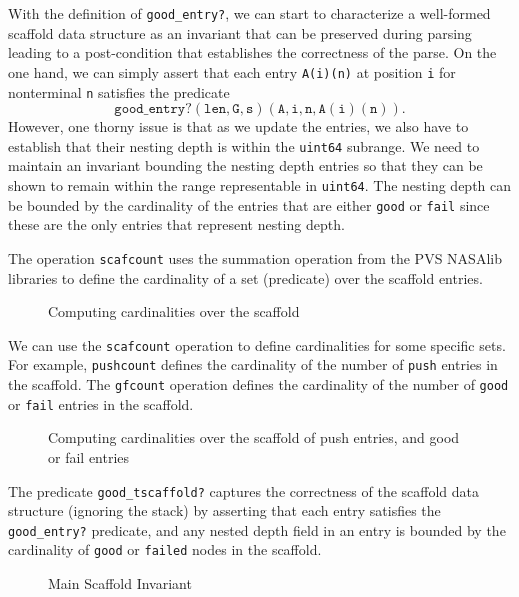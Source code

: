 \documentclass[sigplan,10pt,anonymous,review]{acmart}\settopmatter{printfolios=true,printccs=false,printacmref=false}
\begin{document}
\begin{CCSXML}
With the definition of \texttt{good\_entry?}, we can start to characterize
a well-formed scaffold data structure as an invariant that can be preserved
during parsing leading to a post-condition that establishes the correctness
of the parse.  On the one hand, we can simply assert that each entry \texttt{A(i)(n)} at position \texttt{i} for nonterminal \texttt{n}
satisfies the predicate
$$\mathtt{good\_entry?(len, G, s)(A, i, n, A(i)(n))}.$$  However, one
thorny issue is that as we update the entries, we also have to establish that their
nesting depth is within the \texttt{uint64} subrange.  We need to maintain
an invariant bounding the nesting depth entries so that they can be shown to
remain within the range representable in \texttt{uint64}\@.  The nesting
depth can be bounded by the cardinality of the entries that are
either \texttt{good} or \texttt{fail} since these are the only entries that
represent nesting depth.

The operation \texttt{scafcount} uses the summation operation from
the PVS NASAlib libraries to define the cardinality of a set (predicate)
over the scaffold entries.  

\begin{figure}[h!]
  
    \vspace*{-4mm}
\caption{Computing cardinalities over the scaffold}
\label{pvs:scafcount}
\end{figure}

We can use the \texttt{scafcount} operation to define cardinalities
for some specific sets.  For example, \texttt{pushcount} defines the
cardinality of the number of \texttt{push} entries in the scaffold.
The \texttt{gfcount} operation defines the cardinality of the number
of \texttt{good} or \texttt{fail} entries in the scaffold.

\begin{figure}[h!]
  
    \vspace*{-4mm}
\caption{Computing cardinalities over the scaffold of push entries, and good or fail entries}
\label{pvs:gfcount}
\end{figure}

The predicate \texttt{good\_tscaffold?} captures the correctness of the scaffold
data structure (ignoring the stack) by asserting that each  entry
satisfies the \texttt{good\_entry?} predicate, and any nested depth field
in an entry is bounded by the cardinality of \texttt{good} or \texttt{failed} nodes in the scaffold.  
\begin{figure}[h!]
  
    \vspace*{-4mm}
\caption{Main Scaffold Invariant}
\label{pvs:goodtscaffold}
\end{figure}


\end{CCSXML}
\end{document}
